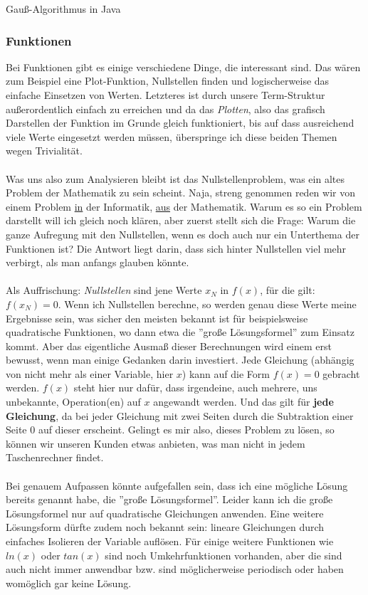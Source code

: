			{Gauß-Algorithmus in Java}


\subsubsection{Funktionen}
Bei Funktionen gibt es einige verschiedene Dinge, die interessant sind. Das wären zum Beispiel eine Plot-Funktion, Nullstellen finden und logischerweise das einfache Einsetzen von Werten. Letzteres ist durch unsere Term-Struktur außerordentlich einfach zu erreichen und da das \textit{Plotten}, also das grafisch Darstellen der Funktion im Grunde gleich funktioniert, bis auf dass ausreichend viele Werte eingesetzt werden müssen, überspringe ich diese beiden Themen wegen Trivialität.\\
\\
Was uns also zum Analysieren bleibt ist das Nullstellenproblem, was ein altes Problem der Mathematik zu sein scheint. Naja, streng genommen reden wir von einem Problem \underline{in} der Informatik, \underline{aus} der Mathematik. Warum es so ein Problem darstellt will ich gleich noch klären, aber zuerst stellt sich die Frage: Warum die ganze Aufregung mit den Nullstellen, wenn es doch auch nur ein Unterthema der Funktionen ist? Die Antwort liegt darin, dass sich hinter Nullstellen viel mehr verbirgt, als man anfangs glauben könnte.\\
\\
Als Auffrischung: \textit{Nullstellen} sind jene Werte $x_{N}$ in $f(x)$, für die gilt: $f(x_{N})=0$. Wenn ich Nullstellen berechne, so werden genau diese Werte meine Ergebnisse sein, was sicher den meisten bekannt ist für beispielsweise quadratische Funktionen, wo dann etwa die ''große Lösungsformel'' zum Einsatz kommt. Aber das eigentliche Ausmaß dieser Berechnungen wird einem erst bewusst, wenn man einige Gedanken darin investiert. Jede Gleichung (abhängig von nicht mehr als einer Variable, hier $x$) kann auf die Form $f(x)=0$ gebracht werden. $f(x)$ steht hier nur dafür, dass irgendeine, auch mehrere, uns unbekannte, Operation(en) auf $x$ angewandt werden. Und das gilt für \textbf{jede Gleichung}, da bei jeder Gleichung mit zwei Seiten durch die Subtraktion einer Seite $0$ auf dieser erscheint. Gelingt es mir also, dieses Problem zu lösen, so können wir unseren Kunden etwas anbieten, was man nicht in jedem Taschenrechner findet.\\
\\
Bei genauem Aufpassen könnte aufgefallen sein, dass ich eine mögliche Lösung bereits genannt habe, die ''große Lösungsformel''. Leider kann ich die große Lösungsformel nur auf quadratische Gleichungen anwenden. Eine weitere Lösungsform dürfte zudem noch bekannt sein: lineare Gleichungen durch einfaches Isolieren der Variable auflösen. Für einige weitere Funktionen wie $ln(x)$ oder $tan(x)$ sind noch Umkehrfunktionen vorhanden, aber die sind auch nicht immer anwendbar bzw. sind möglicherweise periodisch oder haben womöglich gar keine Lösung.\\
